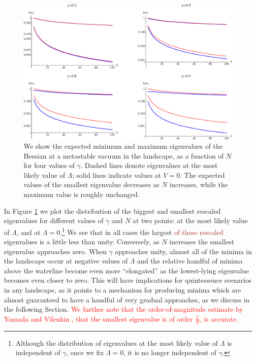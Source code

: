 \documentclass[12pt]{article}
\newcommand{\sh}[1]{\textcolor{brown}{#1}}
\newcommand{\LFL}[1]{\textcolor{red}{#1}}
\begin{document}
\begin{figure} 
  \centering
  \includegraphics[width=.9\linewidth]{eign.eps}
  \caption{We show the expected minimum and maximum eigenvalues of the Hessian at a metastable vacuum in the landscape, as a function of $N$ for four values of $\gamma$.  Dashed lines denote eigenvalues at the most likely value of $\Lambda$; solid lines indicate values at $V=0$. The expected values of the smallest eigenvalue decreases as $N$ increases, while the maximum value is roughly unchanged. }
  \label{eigen}
\end{figure}

In Figure \ref{eigen} we plot the distribution of the biggest and smallest rescaled eigenvalues for different values of $\gamma$ and $N$ at two points: at the most likely value of $\Lambda$, and at $\Lambda=0$.\footnote{Although the distribution of eigenvalues at the most likely value of $\Lambda$ is independent of $\gamma$, once we fix $\Lambda=0$, it is no longer independent of $\gamma$.} We see that in all cases the largest \sh{of these rescaled} eigenvalues is a little less than unity. Conversely, as $N$ increases the smallest eigenvalue approaches zero. When $\gamma$ approaches unity, almost all of the minima in the landscape  occur at negative values of $\Lambda$ and the relative handful of minima above the waterline become even more ``elongated'' as the lowest-lying eigenvalue becomes even closer to zero. This will have implications for quintessence scenarios in any landscape, as it points to a mechanism for producing minima which are almost guaranteed to have a handful of very gradual approaches, as we discuss in the following Section. \LFL{We further note that the order-of-magnitude estimate by Yamada and Vilenkin \cite{Yamada2018}, that the smallest eigenvalue is of order $\frac{1}{N}$, is accurate.}
\end{document}
